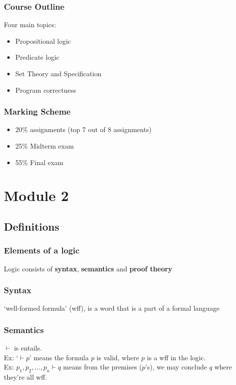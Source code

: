 \documentclass[12pt]{report}
\begin{document}
    \subsection{Course Outline}
      Four main topics:
      \begin{itemize}
        \item Propositional logic
        \item Predicate logic
        \item Set Theory and Specification
        \item Program correctness
      \end{itemize}

    \subsection{Marking Scheme}
      \begin{itemize}
        \item 20\% assignments (top 7 out of 8 assignments)
        \item 25\% Midterm exam
        \item 55\% Final exam
      \end{itemize}


\chapter{Module 2}
  \section{Definitions}
    \subsection{Elements of a logic}
      Logic consists of \textbf{syntax}, \textbf{semantics} and \textbf{proof
      theory}
    \subsection{Syntax}
      `well-formed formula' (wff), is a word that is a part of a formal
      language
    \subsection{Semantics}
      $\vdash$ is entails. \\
      Ex: `$\vdash p$' means the formula $p$ is valid, where $p$ is a wff in the
      logic.\\
      Ex: $p_1, p_2,\ldots,p_n \vdash q$ means from the premises ($p$'s), we
      may conclude $q$ where they're all wff.
\end{document}
